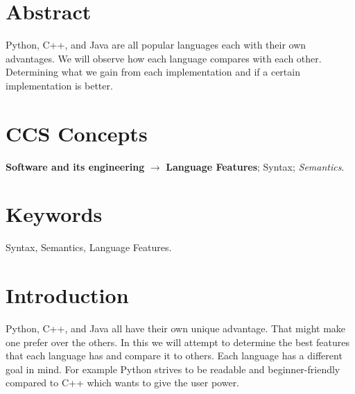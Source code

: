 \documentclass[sigconf, nonacm, authorversion, language=english, 12pt]{acmart}
\begin{document}





\PLtitle


\section*{Abstract}
Python, C++, and Java are all popular languages each with their own advantages. We will observe how each 
language compares with each other. Determining what we gain from each implementation and if a certain implementation is 
better.\\

\section*{CCS Concepts}
\textbullet\hspace*{0.5mm} \textbf{Software and its engineering} $\rightarrow$ \textbf{Language Features}; Syntax; \textit{Semantics}.\\
\section*{Keywords}
Syntax, Semantics, Language Features.\\
\section{Introduction}
Python, C++, and Java all have their own unique advantage. That might make one prefer over the others.
In this we will attempt to determine the best features that each language has and compare it to others.
Each language has a different goal in mind. For example Python strives to be readable and beginner-friendly compared to C++
which wants to give the user power.\\
\end{document}
